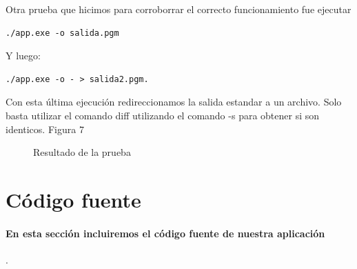 \documentclass [12pt, a4paper]{article}
\begin{document}
	Otra prueba que hicimos para corroborrar el correcto funcionamiento fue ejecutar 
	\begin{lstlisting}[frame=simple,stepnumber=0]
./app.exe -o salida.pgm
	\end{lstlisting} Y luego:
	\begin{lstlisting}[frame=simple,stepnumber=0] 
./app.exe -o - > salida2.pgm. 
	\end{lstlisting} 
	
	Con esta última ejecución redireccionamos la salida estandar a un archivo. Solo basta utilizar el comando diff utilizando el comando -s para obtener si son identicos. Figura 7
	
	\begin{figure}[h]
	\centering
	\caption{Resultado de la prueba}
	\label{result6}
\end{figure}
	
	\clearpage
	\section{Código fuente}
	\paragraph{En esta sección incluiremos el código fuente de nuestra aplicación}
	{. }
	
	
	
	
	
\end{document}
